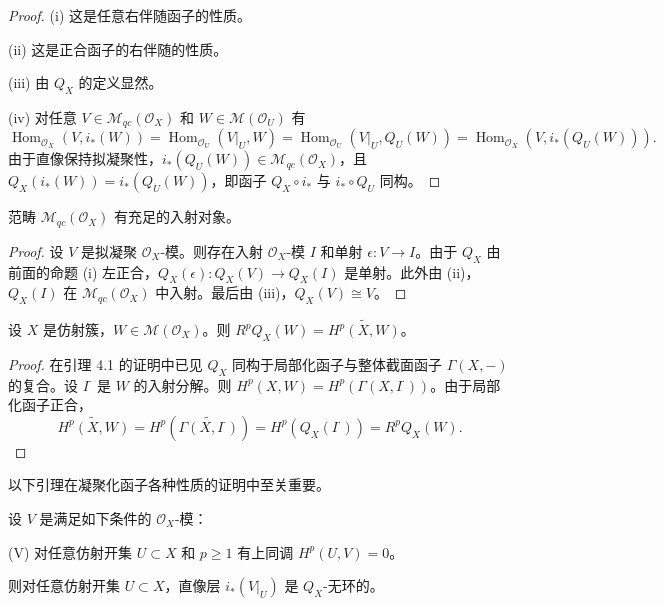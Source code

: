 \begin{proof}
(i) 这是任意右伴随函子的性质。

(ii) 这是正合函子的右伴随的性质。

(iii) 由 $Q_X$ 的定义显然。

(iv) 对任意 $V\in\mathcal{M}_{qc}(\mathcal{O}_X)$ 和 $W\in\mathcal{M}(\mathcal{O}_U)$ 有
$$\operatorname{Hom}_{\mathcal{O}_X}(V,i_*(W))=\operatorname{Hom}_{\mathcal{O}_U}(V|_U,W)=\operatorname{Hom}_{\mathcal{O}_U}(V|_U,Q_U(W))=\operatorname{Hom}_{\mathcal{O}_X}(V,i_*(Q_U(W))).$$
由于直像保持拟凝聚性，$i_*(Q_U(W))\in\mathcal{M}_{qc}(\mathcal{O}_X)$，且 $Q_X(i_*(W))=i_*(Q_U(W))$，即函子 $Q_X\circ i_*$ 与 $i_*\circ Q_U$ 同构。
\end{proof}

\begin{theorem}
范畴 $\mathcal{M}_{qc}(\mathcal{O}_X)$ 有充足的入射对象。
\end{theorem}

\begin{proof}
设 $V$ 是拟凝聚 $\mathcal{O}_X$-模。则存在入射 $\mathcal{O}_X$-模 $I$ 和单射 $\epsilon:V\to I$。由于 $Q_X$ 由前面的命题 (i) 左正合，$Q_X(\epsilon):Q_X(V)\to Q_X(I)$ 是单射。此外由 (ii)，$Q_X(I)$ 在 $\mathcal{M}_{qc}(\mathcal{O}_X)$ 中入射。最后由 (iii)，$Q_X(V)\cong V$。
\end{proof}

\begin{lemma}
设 $X$ 是仿射簇，$W\in\mathcal{M}(\mathcal{O}_X)$。则 $R^pQ_X(W)=\widetilde{H^p(X,W)}$。
\end{lemma}

\begin{proof}
在引理 4.1 的证明中已见 $Q_X$ 同构于局部化函子与整体截面函子 $\Gamma(X,-)$ 的复合。设 $I^\cdot$ 是 $W$ 的入射分解。则 $H^p(X,W)=H^p(\Gamma(X,I^\cdot))$。由于局部化函子正合，
$$\widetilde{H^p(X,W)}=H^p(\widetilde{\Gamma(X,I^\cdot)})=H^p(Q_X(I^\cdot))=R^pQ_X(W).$$
\end{proof}

以下引理在凝聚化函子各种性质的证明中至关重要。

\begin{lemma}
设 $V$ 是满足如下条件的 $\mathcal{O}_X$-模：

(V) 对任意仿射开集 $U\subset X$ 和 $p\ge 1$ 有上同调 $H^p(U,V)=0$。

则对任意仿射开集 $U\subset X$，直像层 $i_*(V|_U)$ 是 $Q_X$-无环的。
\end{lemma}

